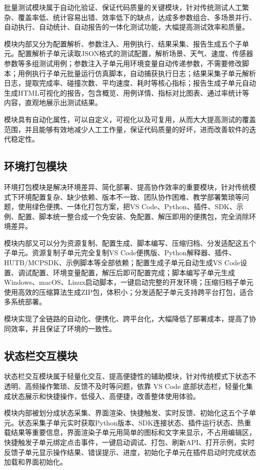 批量测试模块属于自动化验证、保证代码质量的关键模块，针对传统测试人工繁杂、覆盖率低、统计容易出错、效率低下的缺点，达成多参数组合、多场景并行、自动执行、自动统计、自动报告的一体化测试功能，大幅提高测试效率和质量。

模块内部又分为配置解析、参数注入、用例执行、结果采集、报告生成五个子单元。配置解析子单元读取JSON格式的测试配置，解析场景、天气、速度、传感器参数等多组测试用例；参数注入子单元用环境变量自动传递参数，不需要修改脚本；用例执行子单元批量运行仿真脚本，自动捕获执行日志；结果采集子单元解析日志，提取完成率、碰撞次数、平均速度、耗时等核心指标；报告生成子单元自动生成HTML可视化的报告，包含概览、用例详情、指标对比图表、通过率统计等内容，直观地展示出测试结果。

模块具有自动化属性，可以自定义，可视化以及可复用，从而大大提高测试的覆盖范围，并且能够有效地减少人工工作量，保证代码质量的好坏，进而改善软件的迭代稳定性。

\subsection{环境打包模块}

环境打包模块是解决环境差异、简化部署、提高协作效率的重要模块，针对传统模式下环境配置复杂、缺少依赖、版本不一致、团队协作困难、教学部署繁琐等问题，使用绿色便携、一体化打包方案，把VS
Code、Python、插件、SDK、示例、配置、脚本统一整合成一个免安装、免配置、解压即用的便携包，完全消除环境差异。

模块内部又可以分为资源复制、配置生成、脚本编写、压缩归档、分发适配这五个子单元。资源复制子单元完全复制VS Code便携版、Python解释器、插件、HUTB/MCPSDK、示例脚本等全部依赖；配置生成子单元自动生成VS Code设置、调试配置、环境变量配置，解压后即可配置完成；脚本编写子单元生成Windows、macOS、Linux启动脚本，一键启动完整的开发环境；压缩归档子单元使用高效的压缩算法生成ZIP包，体积小；分发适配子单元支持跨平台打包，适合多系统部署。

模块实现了全链路的自动化、便携化、跨平台化，大幅降低了部署成本，提高了协同效率，并且保证了环境的一致性。

\subsection{状态栏交互模块}

状态栏交互模块属于轻量化交互、提高便捷性的辅助模块，针对传统模式下状态不透明、高频操作繁琐、反馈不及时等问题，依靠
VS Code
底部状态栏，轻量化集成状态展示和快捷操作，低侵入、高便捷，改善整体使用体验。

模块内部被划分成状态采集、界面渲染、快捷触发、实时反馈、初始化这五个子单元。状态采集子单元实时获取Python版本、SDK连接状态、插件运行状态、热重载结果等重要信息，界面渲染子单元用简单的图标和文字来显示，不占用编辑区，快捷触发子单元绑定点击事件，一键启动调试、打包、刷新API、打开示例，实时反馈子单元显示操作结果、错误提示、进度，初始化子单元在插件启动时完成状态加载和界面初始化。

